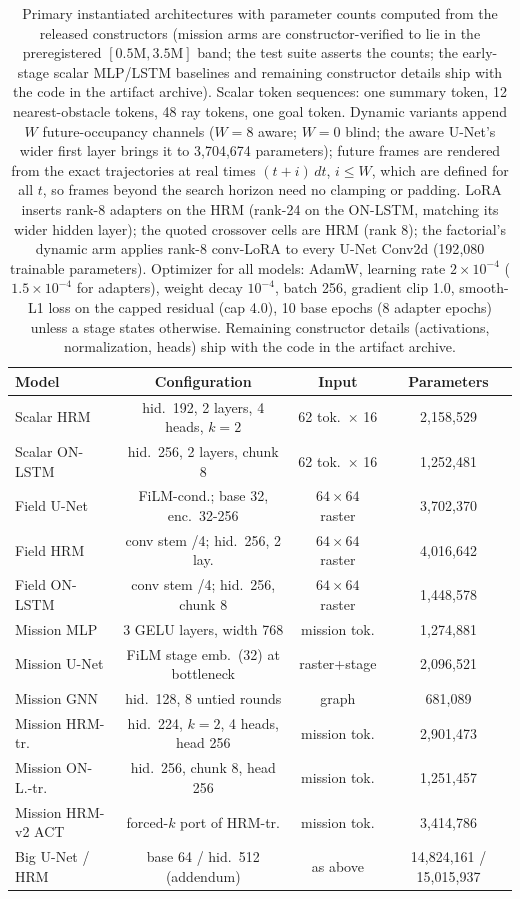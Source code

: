 \documentclass[letterpaper]{article} %
\begin{document}
\begin{table}[t]
\centering
\small
\setlength{\tabcolsep}{1.6pt}
\begin{tabular}{@{}lccc@{}}
\toprule
Model & Configuration & Input & Parameters \\
\midrule
Scalar HRM & hid.\ 192, 2 layers, 4 heads, $k{=}2$ & 62 tok.\ $\times$ 16 & 2{,}158{,}529 \\
Scalar ON-LSTM & hid.\ 256, 2 layers, chunk 8 & 62 tok.\ $\times$ 16 & 1{,}252{,}481 \\
Field U-Net & FiLM-cond.; base 32, enc.\ 32-256 & $64{\times}64$ raster & 3{,}702{,}370 \\
Field HRM & conv stem /4; hid.\ 256, 2 lay. & $64{\times}64$ raster & 4{,}016{,}642 \\
Field ON-LSTM & conv stem /4; hid.\ 256, chunk 8 & $64{\times}64$ raster & 1{,}448{,}578 \\
\midrule
Mission MLP & 3 GELU layers, width 768 & mission tok. & 1{,}274{,}881 \\
Mission U-Net & FiLM stage emb.\ (32) at bottleneck & raster+stage & 2{,}096{,}521 \\
Mission GNN & hid.\ 128, 8 untied rounds & graph & 681{,}089 \\
Mission HRM-tr. & hid.\ 224, $k{=}2$, 4 heads, head 256 & mission tok. & 2{,}901{,}473 \\
Mission ON-L.-tr. & hid.\ 256, chunk 8, head 256 & mission tok. & 1{,}251{,}457 \\
Mission HRM-v2 ACT & forced-$k$ port of HRM-tr. & mission tok. & 3{,}414{,}786 \\
Big U-Net / HRM & base 64 / hid.\ 512 (addendum) & as above & 14{,}824{,}161 / 15{,}015{,}937 \\
\bottomrule
\end{tabular}
\caption{Primary instantiated architectures with parameter counts computed from the released constructors (mission arms are constructor-verified to lie in the preregistered $[0.5\mathrm{M}, 3.5\mathrm{M}]$ band; the test suite asserts the counts; the early-stage scalar MLP/LSTM baselines and remaining constructor details ship with the code in the artifact archive). Scalar token sequences: one summary token, 12 nearest-obstacle tokens, 48 ray tokens, one goal token. Dynamic variants append $W$ future-occupancy channels ($W{=}8$ aware; $W{=}0$ blind; the aware U-Net's wider first layer brings it to 3{,}704{,}674 parameters); future frames are rendered from the exact trajectories at real times $(t{+}i)\,dt$, $i \le W$, which are defined for all $t$, so frames beyond the search horizon need no clamping or padding. LoRA \citep{hu2021lora} inserts rank-8 adapters on the HRM (rank-24 on the ON-LSTM, matching its wider hidden layer); the quoted crossover cells are HRM (rank 8); the factorial's dynamic arm applies rank-8 conv-LoRA to every U-Net Conv2d (192{,}080 trainable parameters). Optimizer for all models: AdamW, learning rate $2{\times}10^{-4}$ ($1.5{\times}10^{-4}$ for adapters), weight decay $10^{-4}$, batch 256, gradient clip 1.0, smooth-L1 loss on the capped residual (cap 4.0), 10 base epochs (8 adapter epochs) unless a stage states otherwise. Remaining constructor details (activations, normalization, heads) ship with the code in the artifact archive.}

\end{table}
\end{document}
